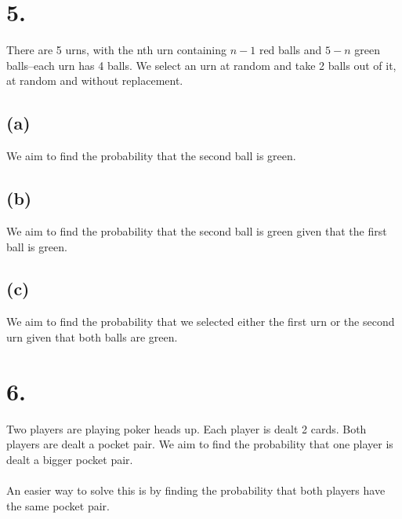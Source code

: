 \documentclass{article}
\begin{document}
\section*{5.}
{\Large 
There are 5 urns, with the nth urn containing $n-1$ red balls and $5-n$ green balls--each urn has 4 balls. We select an urn at random and take 2 balls out of it, at random and without replacement.

\subsection*{(a)}
We aim to find the probability that the second ball is green.

\subsection*{(b)}
We aim to find the probability that the second ball is green given that the first ball is green.

\subsection*{(c)}
We aim to find the probability that we selected either the first urn or the second urn given that both balls are green. 

}

\section*{6.}
{\Large 
Two players are playing poker heads up. Each player is dealt 2 cards. Both players are dealt a pocket pair. We aim to find the probability that one player is dealt a bigger pocket pair. \\ \\
An easier way to solve this is by finding the probability that both players have the same pocket pair. 

}
\end{document}
